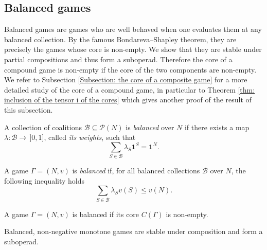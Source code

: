 \documentclass[a4paper,12pt]{amsart}
\newcommand{\calB}{\mathcal{B}}
\begin{document}
\subsection{Balanced games}
Balanced games are games who are well behaved when one evaluates them at any balanced collection. By the famous Bondareva--Shapley theorem, they are precisely the games whose core is non-empty. We show that they are stable under partial compositions and thus form a suboperad. Therefore the core of a compound game is non-empty if the core of the two components are non-empty. We refer to Subsection \ref{Subsection: the core of a composite game} for a more detailed study of the core of a compound game, in particular to Theorem \ref{thm: inclusion of the tensor i of the cores} which gives another proof of the result of this subsection.

\begin{definition}
    A collection of coalitions \(\calB \subseteq \mathcal{P}(N)\) is \emph{balanced} over \(N\) if there exists a map \(\lambda: \calB \to \hspace{2pt} ]0, 1]\), called \textit{its weights}, such that 
    \[
    \sum_{S \in \calB} \lambda_S \mathbf{1}^S = \mathbf{1}^N.
    \]
\end{definition}

\begin{definition}
A game \(\Gamma = (N, v)\) is \emph{balanced} if, for all balanced collections \(\calB\) over \(N\), the following inequality holds
    \[
    \sum_{S \in \calB} \lambda_S v(S) \leq v(N). 
    \]
\end{definition}

\begin{theorem}\label{thm: bondareva-shapley}
A game \(\Gamma = (N, v)\) is balanced if its core $C(\Gamma)$ is non-empty. 
\end{theorem}

\begin{theorem}\label{prop: balanced}
    Balanced, non-negative monotone games are stable under composition and form a suboperad. 
\end{theorem}
\end{document}
